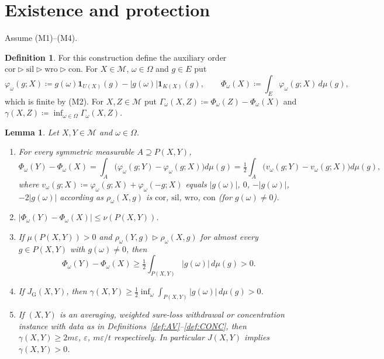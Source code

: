 \documentclass[11pt]{article}
\newtheorem{lemma}[theorem]{Lemma}
\theoremstyle{definition}
\newtheorem{definition}[theorem]{Definition}
\newcommand{\M}{\mathcal M}
\newcommand{\one}{\mathbf 1}
\newcommand{\cor}{\mathrm{cor}}
\newcommand{\sil}{\mathrm{sil}}
\newcommand{\wro}{\mathrm{wro}}
\newcommand{\con}{\mathrm{con}}
\newcommand{\GU}{\mathrm{G}}
\begin{document}
\section{Existence and protection}\label{sec:existence}

Assume (M1)--(M4).

\begin{definition}\label{def:Phi}
For this construction define the auxiliary order $\cor\rhd\sil\rhd\wro\rhd\con$. For $X\in\M$, $\omega\in\Omega$ and $g\in E$ put
\[
\varphi_\omega(g;X)\coloneqq g(\omega)\one_{U(X)}(g)-|g(\omega)|\one_{K(X)}(g),\qquad \Phi_\omega(X)\coloneqq\int_E\varphi_\omega(g;X)\,d\mu(g),
\]
which is finite by (M2). For $X,Z\in\M$ put $\Gamma_\omega(X,Z)\coloneqq\Phi_\omega(Z)-\Phi_\omega(X)$ and $\gamma(X,Z)\coloneqq\inf_{\omega\in\Omega}\Gamma_\omega(X,Z)$.
\end{definition}

\begin{lemma}\label{lem:Phi}
Let $X,Y\in\M$ and $\omega\in\Omega$.
\begin{enumerate}[label=(\alph*)]
\item For every symmetric measurable $A\supseteq P(X,Y)$,
\[
\Phi_\omega(Y)-\Phi_\omega(X)=\int_A\bigl(\varphi_\omega(g;Y)-\varphi_\omega(g;X)\bigr)d\mu(g)=\tfrac12\int_A\bigl(v_\omega(g;Y)-v_\omega(g;X)\bigr)d\mu(g),
\]
where $v_\omega(g;X)\coloneqq\varphi_\omega(g;X)+\varphi_\omega(-g;X)$ equals $|g(\omega)|$, $0$, $-|g(\omega)|$, $-2|g(\omega)|$ according as $\rho_\omega(X,g)$ is $\cor$, $\sil$, $\wro$, $\con$ (for $g(\omega)\ne0$).
\item $|\Phi_\omega(Y)-\Phi_\omega(X)|\le\nu(P(X,Y))$.
\item If $\mu(P(X,Y))>0$ and $\rho_\omega(Y,g)\rhd\rho_\omega(X,g)$ for almost every $g\in P(X,Y)$ with $g(\omega)\ne0$, then
\[
\Phi_\omega(Y)-\Phi_\omega(X)\ge\tfrac12\int_{P(X,Y)}|g(\omega)|\,d\mu(g)>0.
\]
\item If $J_\GU(X,Y)$, then $\gamma(X,Y)\ge\frac12\inf_{\omega}\int_{P(X,Y)}|g(\omega)|\,d\mu(g)>0$.
\item If $(X,Y)$ is an averaging, weighted sure-loss withdrawal or concentration instance with data as in Definitions~\ref{def:AV}--\ref{def:CONC}, then $\gamma(X,Y)\ge 2m\varepsilon$, $\varepsilon$, $m\varepsilon/t$ respectively. In particular $J(X,Y)$ implies $\gamma(X,Y)>0$.
\end{enumerate}
\end{lemma}
\end{document}

